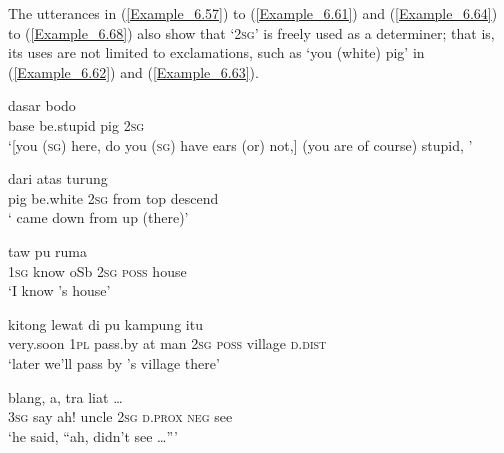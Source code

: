 The utterances in (\ref{Example_6.57}) to (\ref{Example_6.61}) and (\ref{Example_6.64}) to (\ref{Example_6.68}) also show that  ‘\textsc{2sg}’ is freely used as a determiner; that is, its uses are not limited to exclamations, such as  ‘you (white) pig’ in (\ref{Example_6.62}) and (\ref{Example_6.63}).


\ea
\label{Example_6.62}
\gll {\ldots} {dasar} {bodo} {} {}\\ %
{ }   base  be.stupid  pig  \textsc{2sg}\\
\glt
‘[you (\textsc{sg}) here, do you (\textsc{sg}) have ears (or) not,] (you are of course) stupid, ’ \textstyleExampleSource{[081014-016-Cv.0047]}
\z

\ea
\label{Example_6.63}
 {} {} {dari} {atas} {turung}\\ %
 pig  be.white  \textsc{2sg}  from  top  descend\\

 ‘ came down from up (there)’ \textstyleExampleSource{[081025-006-Cv.0260]}
\z

\ea
\label{Example_6.64}
 {taw} {} {} {pu} {ruma}\\ %
 \textsc{1sg}  know  oSb  \textsc{2sg}  \textsc{poss}  house\\

\glt
‘I know ’s house’ \textstyleExampleSource{[080922-010a-CvNF.0238]}
\z

\ea
\label{Example_6.65}
 {kitong} {lewat} {di} {} {} {pu} {kampung} {itu}\\ %
 very.soon  \textsc{1pl}  pass.by  at  man  \textsc{2sg}  \textsc{poss}  village  \textsc{d.dist}\\

\glt
‘later we’ll pass by ’s village there’ \textstyleExampleSource{[081012-001-Cv.0017]}
\z

\ea
\label{Example_6.66}
 {blang,} {a,} {} {} {} {tra} {liat} {\ldots}\\ %
 \textsc{3sg}  say  ah!  uncle  \textsc{2sg}  \textsc{d.prox}  \textsc{neg}  see  \\

\glt
‘he said, ``ah,  didn’t see {\ldots}''' \textstyleExampleSource{[080923-009-Cv.0051]}
\z


